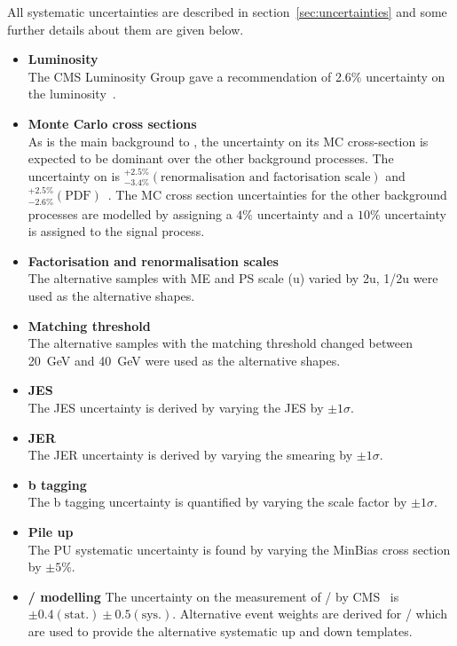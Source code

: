 All systematic uncertainties are described in section~\ref{sec:uncertainties} and some further details about them are given below.

\begin{itemize}
\item \textbf{Luminosity}\\
The CMS Luminosity Group gave a recommendation of 2.6$\%$ uncertainty on the luminosity~\cite{CMS-PAS-LUM-12-001}.
\item \textbf{Monte Carlo cross sections}\\
As \ttbar is the main background to \tttt, the uncertainty on its MC cross-section is expected to be dominant over the other background processes. The uncertainty on \ttbar is ${}^{+2.5\%}_{-3.4\%} \left( \textrm{renormalisation and factorisation scale} \right)$ and ${}^{+2.5\%}_{-2.6\%} \left( \textrm{PDF} \right)$~\cite{PhysRevLett.110.252004}. The MC cross section uncertainties for the other background processes are modelled by assigning a $4\%$ uncertainty and a $10\%$ uncertainty is assigned to the signal process.
\item \textbf{Factorisation and renormalisation scales}\\
The alternative \ttbar samples with ME and PS scale (u) varied by 2u, 1/2u were used as the alternative shapes.
\item \textbf{Matching threshold}\\
The alternative \ttbar samples with the matching threshold changed between 20~GeV and 40~GeV were used as the alternative shapes.
\item \textbf{JES}\\
The JES uncertainty is derived by varying the JES by $\pm1\sigma$.
\item \textbf{JER}\\
The JER uncertainty is derived by varying the smearing by $\pm1\sigma$.
\item \textbf{b tagging}\\
The b tagging uncertainty is quantified by varying the scale factor by $\pm1\sigma$.
\item \textbf{Pile up}\\
The PU systematic uncertainty is found by varying the MinBias cross section by $\pm5\%$.
\item \textbf{\heavyflavourone / \heavyflavourtwo modelling}
The uncertainty on the measurement of \heavyflavourone / \heavyflavourtwo by CMS~\cite{Khachatryan2015132} is $\pm 0.4 \left( \textrm{stat.} \right) \pm 0.5 \left(\textrm{sys.} \right)$. Alternative event weights are derived for \heavyflavourone / \heavyflavourtwo which are used to provide the alternative systematic up and down templates.
 \end{itemize}
 
